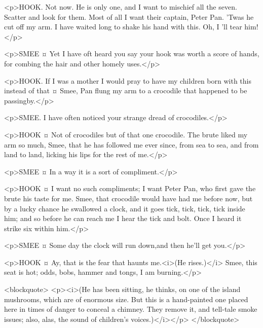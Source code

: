 <p>HOOK. Not now. He is only one, and I want to mischief all the seven. Scatter and look for them.
Most of all I want their captain, Peter Pan. 'Twas he cut off my arm. I have waited long to shake his hand with this.
Oh, I 'll tear him!</p>

<p>SMEE ¤
Yet I have oft heard you say your hook was worth a score of hands, for combing the hair and other homely uses.</p>

<p>HOOK. If I was a mother I would pray to have my children born with this instead of that ¤
Smee, Pan flung my arm to a crocodile that happened to be passingby.</p>

<p>SMEE. I have often noticed your strange dread of crocodiles.</p>

<p>HOOK ¤
Not of crocodiles but of that one crocodile.
The brute liked my arm so much, Smee, that he has followed me ever since, from sea to sea, and from land to land, licking his lips for the rest of me.</p>

<p>SMEE ¤
In a way it is a sort of compliment.</p>

<p>HOOK ¤
I want no such compliments; I want Peter Pan, who first gave the brute his taste for me. Smee, that crocodile would have had me before now, but by a lucky chance he swallowed a clock, and it goes tick, tick, tick, tick inside him; and so before he can reach me I hear the tick and bolt.
Once I heard it strike six within him.</p>

<p>SMEE ¤
Some day the clock will run down,and then he'll get you.</p>

<p>HOOK ¤
Ay, that is the fear that haunts me.<i>(He rises.)</i> Smee, this seat is hot; odds, bobs, hammer and tongs, I am burning.</p>

<blockquote> <p><i>(He has been sitting, he thinks, on one of the island mushrooms, which are of enormous size. But this is a hand-painted one placed here in times of danger to conceal a chimney. They remove it, and tell-tale smoke issues; also, alas, the sound of children's voices.)</i></p> </blockquote>

